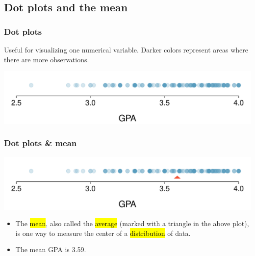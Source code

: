 
\subsection{Dot plots and the mean}


\begin{frame}
\frametitle{Dot plots}

Useful for visualizing one numerical variable. Darker colors represent areas where there are more observations.

\begin{center}
\includegraphics[width=\textwidth]{2-1_numerical_data/figures/gpa_dot_plot/gpa_dot_plot}
\end{center}


\end{frame}



\begin{frame}
\frametitle{Dot plots \& mean}

\begin{center}
\includegraphics[width=\textwidth]{2-1_numerical_data/figures/gpa_dot_plot/gpa_dot_plot_mean}
\end{center}

\begin{itemize}

\item The \hl{mean}, also called the \hl{average} (marked with a triangle in the above plot), is one way to measure the center of a \hl{distribution} of data.

\item The mean GPA is 3.59.

\end{itemize} 

\end{frame}

